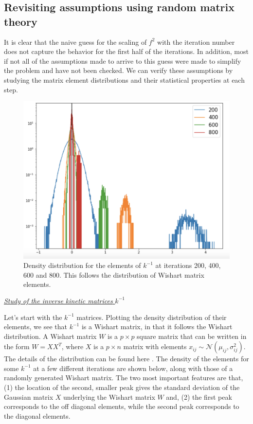 \documentclass[11pt]{article}
\begin{document}
\subsection{Revisiting assumptions using random matrix theory}

It is clear that the naive guess for the scaling of $f^2$ with the iteration number does not capture the behavior for the first half of the iterations. In addition, most if not all of the assumptions made to arrive to this guess were made to simplify the problem and have not been checked. We can verify these assumptions by studying the matrix element distributions and their statistical properties at each step.


\begin{figure}[h]
    \centering
    \includegraphics[width=0.75\linewidth]{figs/kinv-distributions.png}
    \caption{Density distribution for the elements of $k^{-1}$ at iterations 200, 400, 600 and 800. This follows the distribution of Wishart matrix elements.}
    \label{fig:kinv-dist}
\end{figure}

\begin{center}
    \underline{\textit{Study of the inverse kinetic matrices} $k^{-1}$}
\end{center}

Let's start with the $k^{-1}$ matrices. Plotting the density distribution of their elements, we see that $k^{-1}$ is a Wishart matrix, in that it follows the Wishart distribution. A Wishart matrix $W$ is a $p\times p$ square matrix that can be written in the form $W = XX^T$, where $X$ is a $p \times n$ matrix with elements $x_{ij} \sim \mathcal{N}(\mu_{ij},\sigma_{ij} ^2)$. The details of the distribution can be found here \cite{RMTguide}. The density of the elements for some $k^{-1}$ at a few different iterations are shown below, along with those of a randomly generated Wishart matrix. The two most important features are that, (1) the location of the second, smaller peak gives the standard deviation of the Gaussian matrix $X$ underlying the Wishart matrix $W$ and, (2) the first peak corresponds to the off diagonal elements, while the second peak corresponds to the diagonal elements. 
\end{document}
